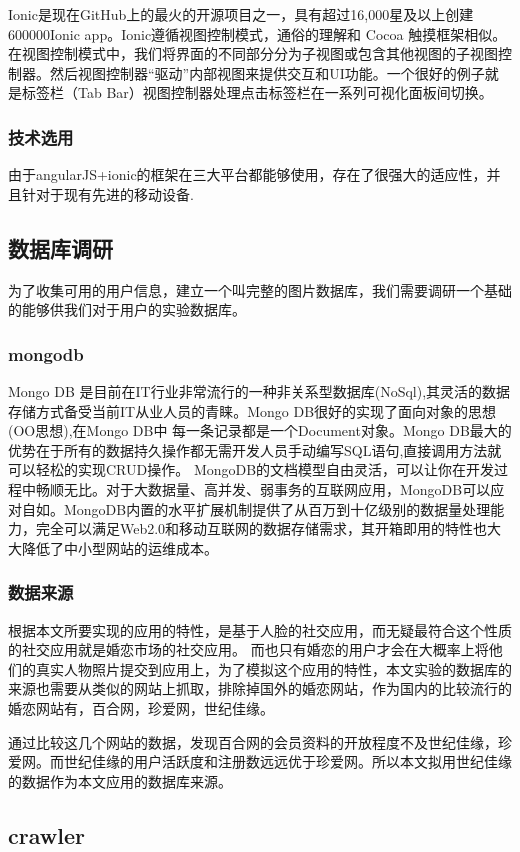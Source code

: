 Ionic是现在GitHub上的最火的开源项目之一，具有超过16,000星及以上创建600000Ionic app。Ionic遵循视图控制模式，通俗的理解和 Cocoa 触摸框架相似。在视图控制模式中，我们将界面的不同部分分为子视图或包含其他视图的子视图控制器。然后视图控制器“驱动”内部视图来提供交互和UI功能。一个很好的例子就是标签栏（Tab Bar）视图控制器处理点击标签栏在一系列可视化面板间切换。
\subsubsection{技术选用}
由于angularJS+ionic的框架在三大平台都能够使用，存在了很强大的适应性，并且针对于现有先进的移动设备.

\subsection{数据库调研}
为了收集可用的用户信息，建立一个叫完整的图片数据库，我们需要调研一个基础的能够供我们对于用户的实验数据库。
\subsubsection{mongodb}
Mongo DB 是目前在IT行业非常流行的一种非关系型数据库(NoSql),其灵活的数据存储方式备受当前IT从业人员的青睐。Mongo DB很好的实现了面向对象的思想(OO思想),在Mongo DB中 每一条记录都是一个Document对象。Mongo DB最大的优势在于所有的数据持久操作都无需开发人员手动编写SQL语句,直接调用方法就可以轻松的实现CRUD操作。
MongoDB的文档模型自由灵活，可以让你在开发过程中畅顺无比。对于大数据量、高并发、弱事务的互联网应用，MongoDB可以应对自如。MongoDB内置的水平扩展机制提供了从百万到十亿级别的数据量处理能力，完全可以满足Web2.0和移动互联网的数据存储需求，其开箱即用的特性也大大降低了中小型网站的运维成本。

\subsubsection{数据来源}
根据本文所要实现的应用的特性，是基于人脸的社交应用，而无疑最符合这个性质的社交应用就是婚恋市场的社交应用。
而也只有婚恋的用户才会在大概率上将他们的真实人物照片提交到应用上，为了模拟这个应用的特性，本文实验的数据库的来源也需要从类似的网站上抓取，排除掉国外的婚恋网站，作为国内的比较流行的婚恋网站有，百合网，珍爱网，世纪佳缘。


通过比较这几个网站的数据，发现百合网的会员资料的开放程度不及世纪佳缘，珍爱网。而世纪佳缘的用户活跃度和注册数远远优于珍爱网。所以本文拟用世纪佳缘的数据作为本文应用的数据库来源。

\subsection{crawler}
